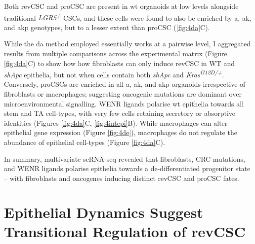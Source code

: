 Both revCSC and proCSC are present in \acrshort{wt} organoids at low levels alongside traditional \textit{LGR5\textsuperscript{+}} CSCs, and these cells were found to also be enriched by \acrshort{a}, \acrshort{ak}, and \acrshort{akp} genotypes, but to a lesser extent than proCSC (\ref{fig:4da}C).

While the \acrshort{da} method employed essentially works at a pairwise level, I aggregated results from multiple comparisons across the experimental matrix (Figure \ref{fig:4da}C) to show how how fibroblasts can only induce revCSC in WT and \textit{shApc} epithelia, but not when cells contain both \textit{shApc} and \textit{Kras\textsuperscript{G12D/+}}. Conversely, proCSCs are enriched in all \acrshort{a}, \acrshort{ak}, and \acrshort{akp} organoids irrespective of fibroblasts or macrophages; suggesting oncogenic mutations are dominant over microenvironmental signalling. WENR ligands polarise \acrshort{wt} epithelia towards all stem and TA cell-types, with very few cells retaining secretory or absorptive identities (Figures \ref{fig:4da}C, \ref{fig:4intepi}B). While macrophages can alter epithelial gene expression (Figure \ref{fig:4de}), macrophages do not regulate the abundance of epithelial cell-types (Figure \ref{fig:4da}C). 

In summary, multivariate scRNA-seq revealed that fibroblasts, CRC mutations, and WENR ligands polarise epithelia towards a de-differentiated progenitor state – with fibroblasts and oncogenes inducing distinct revCSC and proCSC fates.

\section{Epithelial Dynamics Suggest Transitional Regulation of revCSC}

